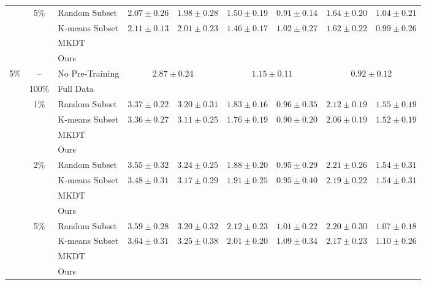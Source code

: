 \begin{table}[t]
{\begin{tabular}{@{}cclcccccc@{}}
& \multirow{4}{*}{5\%} & Random Subset
& $2.07 \pm 0.26$ & $1.98 \pm 0.28$
& $1.50 \pm 0.19$ & $0.91 \pm 0.14$
& $1.64 \pm 0.20$ & $1.04 \pm 0.21$ \\
& & K-means Subset
& $2.11 \pm 0.13$ & $2.01 \pm 0.23$
& $1.46 \pm 0.17$ & $1.02 \pm 0.27$
& $1.62 \pm 0.22$ & $0.99 \pm 0.26$ \\
& & MKDT & & & & & & \\
& & Ours
& &
& &
&  &  \\

\midrule

\multirow{14}{*}{5\%}
& -- & No Pre-Training
& \multicolumn{2}{c}{$2.87 \pm 0.24$}
& \multicolumn{2}{c}{$1.15 \pm 0.11$}
& \multicolumn{2}{c}{$0.92 \pm 0.12$} \\
\cmidrule(lr){2-9}

& 100\% & Full Data
&  & 
&  & 
&  &  \\
\cmidrule(lr){2-9}

& \multirow{4}{*}{1\%} & Random Subset
& $3.37 \pm 0.22$ & $3.20 \pm 0.31$
& $1.83 \pm 0.16$ & $0.96 \pm 0.35$
& $2.12 \pm 0.19$ & $1.55 \pm 0.19$ \\
& & K-means Subset
& $3.36 \pm 0.27$ & $3.11 \pm 0.25$
& $1.76 \pm 0.19$ & $0.90 \pm 0.20$
& $2.06 \pm 0.19$ & $1.52 \pm 0.19$ \\
& & MKDT & & & & & & \\
& & Ours
& &
& &
& & \\
\cmidrule(lr){2-9}

& \multirow{4}{*}{2\%} & Random Subset
& $3.55 \pm 0.32$ & $3.24 \pm 0.25$
& $1.88 \pm 0.20$ & $0.95 \pm 0.29$
& $2.21 \pm 0.26$ & $1.54 \pm 0.31$ \\
& & K-means Subset
& $3.48 \pm 0.31$ & $3.17 \pm 0.29$
& $1.91 \pm 0.25$ & $0.95 \pm 0.40$
& $2.19 \pm 0.22$ & $1.54 \pm 0.31$ \\
& & MKDT & & & & & & \\
& & Ours
& &
& &
&  &  \\
\cmidrule(lr){2-9}

& \multirow{4}{*}{5\%} & Random Subset
& $3.59 \pm 0.28$ & $3.20 \pm 0.32$
& $2.12 \pm 0.23$ & $1.01 \pm 0.22$
& $2.20 \pm 0.30$ & $1.07 \pm 0.18$ \\
& & K-means Subset
& $3.64 \pm 0.31$ & $3.25 \pm 0.38$
& $2.01 \pm 0.20$ & $1.09 \pm 0.34$
& $2.17 \pm 0.23$ & $1.10 \pm 0.26$ \\
& & MKDT & & & & & & \\
& & Ours
&  & 
& &
&  &  \\

\bottomrule
\end{tabular}%
}
\end{table}



